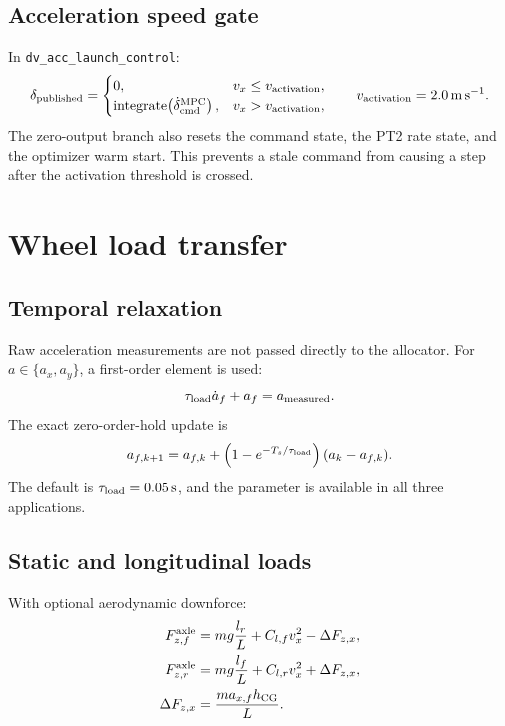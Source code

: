 \documentclass[11pt,a4paper]{article}
\begin{document}
\subsection{Acceleration speed gate}

In \texttt{dv\_acc\_launch\_control}:
\begin{equation}
\delta_{\rm published}=
\begin{cases}
0, & v_x\le v_{\rm activation},\\
\operatorname{integrate}\!\left(\dot\delta_{\rm cmd}^{\rm MPC}\right),
& v_x>v_{\rm activation},
\end{cases}
\qquad v_{\rm activation}=\SI{2.0}{\metre\per\second}.
\end{equation}
The zero-output branch also resets the command state, the PT2 rate state, and
the optimizer warm start. This prevents a stale command from causing a step
after the activation threshold is crossed.

\section{Wheel load transfer}

\subsection{Temporal relaxation}

Raw acceleration measurements are not passed directly to the allocator.
For $a\in\{a_x,a_y\}$, a first-order element is used:
\begin{equation}
\tau_{\rm load}\dot a_f+a_f=a_{\rm measured}.
\end{equation}
The exact zero-order-hold update is
\begin{equation}
a_{f,k+1}=a_{f,k}+
\left(1-e^{-T_s/\tau_{\rm load}}\right)(a_k-a_{f,k}).
\end{equation}
The default is $\tau_{\rm load}=\SI{0.05}{\second}$, and the parameter is
available in all three applications.

\subsection{Static and longitudinal loads}

With optional aerodynamic downforce:
\begin{align}
F_{z,f}^{\rm axle}&=mg\frac{l_r}{L}+C_{l,f}v_x^2-\Delta F_{z,x},\\
F_{z,r}^{\rm axle}&=mg\frac{l_f}{L}+C_{l,r}v_x^2+\Delta F_{z,x},\\
\Delta F_{z,x}&=\frac{ma_{x,f}h_{\rm CG}}{L}.
\end{align}
\end{document}
